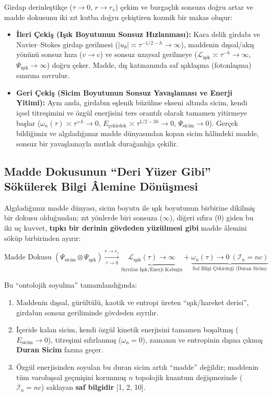 \documentclass[12pt,a4paper]{article}
\begin{document}
Girdap derinleştikçe ($\tau \to 0$, $r \to r_s$) çekim ve burgaçlık sonsuza doğru artar ve madde dokusunu iki zıt kutba doğru çekiştiren kozmik bir makas oluşur:

\begin{itemize}
    \item \textbf{İleri Çekiş (Işık Boyutunun Sonsuz Hızlanması):} Kara delik girdabı ve Navier--Stokes girdap gerilmesi ($|u_\theta| \asymp \tau^{-1/2-h} \to \infty$), maddenin dışsal/akış yönünü sonsuz hıza ($v \to c$) ve sonsuz uzaysal gerilmeye ($\mathcal{L}_{\text{ışık}} \asymp \tau^{-h} \to \infty$, $\Psi_{\text{ışık}} \to \infty$) doğru çeker. Madde, dış katmanında saf ışıklaşma (fotonlaşma) sınırına savrulur.
    \item \textbf{Geri Çekiş (Sicim Boyutunun Sonsuz Yavaşlaması ve Enerji Yitimi):} Aynı anda, girdabın eşlenik büzülme ekseni altında sicim, kendi içsel titreşimini ve özgül enerjisini ters orantılı olarak tamamen yitirmeye başlar ($\omega_n(\tau) \asymp \tau^{+h} \to 0$, $E_{\text{çekirdek}} \asymp \tau^{1/2-3h} \to 0$, $\Psi_{\text{sicim}} \to 0$). Gerçek bildiğimiz ve algıladığımız madde dünyasından kopan sicim hâlindeki madde, sonsuz bir yavaşlamayla mutlak durağanlığa çekilir.
\end{itemize}

\subsection{Madde Dokusunun ``Deri Yüzer Gibi'' Sökülerek Bilgi Âlemine Dönüşmesi}

Algıladığımız madde dünyası, sicim boyutu ile ışık boyutunun birbirine dikilmiş bir dokusu olduğundan; zıt yönlerde biri sonsuza ($\infty$), diğeri sıfıra ($0$) giden bu iki uç kuvvet, \textbf{tıpkı bir derinin gövdeden yüzülmesi gibi} madde âlemini söküp birbirinden ayırır:

\begin{equation}
\text{Madde Dokusu } (\Psi_{\text{sicim}} \otimes \Psi_{\text{ışık}}) \xrightarrow[\tau \to 0]{r \to r_s} \underbrace{\mathcal{L}_{\text{ışık}}(\tau) \to \infty}_{\text{Sıyrılan Işık/Enerji Kabuğu}} + \underbrace{\omega_n(\tau) \to 0 \ (\mathcal{I}_n = n c)}_{\text{Saf Bilgi Çekirdeği (Duran Sicim)}}
\end{equation}

Bu ``ontolojik soyulma'' tamamlandığında:
\begin{enumerate}
    \item Maddenin dışsal, gürültülü, kaotik ve entropi üreten ``ışık/hareket derisi'', girdabın sonsuz geriliminde gövdeden sıyrılır.
    \item İçeride kalan sicim, kendi özgül kinetik enerjisini tamamen boşaltmış ($E_{\text{sicim}} \to 0$), titreşimi sıfırlanmış ($\omega_n = 0$), zamanın ve entropinin dışına çıkmış \textbf{Duran Sicim} fazına geçer.
    \item Özgül enerjisinden soyulan bu duran sicim artık ``madde'' değildir; maddenin tüm varoluşsal geçmişini korunmuş $n$ topolojik kuantum değişmezinde ($\mathcal{I}_n = n c$) saklayan \textbf{saf bilgidir} [1, 2, 10].
\end{enumerate}
\end{document}
